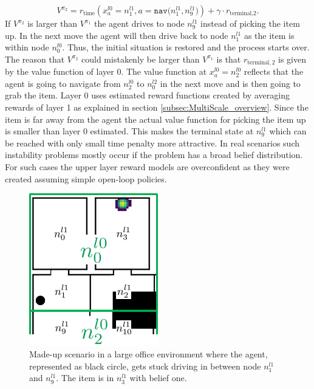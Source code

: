 %
\begin{equation}\label{eq:Vpi2}
V^{\pi_2}=r_\text{time}\left( x_a^{l0}=n_1^{l1}, a=\texttt{nav($n_1^{l1}, n_9^{l1}$)} \right) + \gamma \cdot r_{\text{terminal,}2}.
\end{equation}
If $V^{\pi_2}$ is larger than $V^{\pi_1}$ the agent drives to node $n_9^{l1}$ instead of picking the item up. In the next move the agent will then drive back to node $n_1^{l1}$ as the item is within node $n_0^{l0}$. Thus, the initial situation is restored and the process starts over. The reason that $V^{\pi_2}$ could mistakenly be larger than $V^{\pi_1}$ is that $r_{\text{terminal},2}$ is given by the value function of layer 0. The value function at $x_a^{l0}=n_2^{l0}$ reflects that the agent is going to navigate from $n_2^{l0}$ to $n_0^{l2}$ in the next move and is then going to grab the item. Layer 0 uses estimated reward functions created by averaging rewards of layer 1 as explained in section \ref{subsec:MultiScale_overview}. Since the item is far away from the agent the actual value function for picking the item up is smaller than layer 0 estimated. This makes the terminal state at $n_9^{l1}$ which can be reached with only small time penalty more attractive. In real scenarios such instability problems mostly occur if the problem has a broad belief distribution. For such cases the upper layer reward models are overconfident as they were created assuming simple open-loop policies.   

\begin{figure}
    \centering
    \includegraphics[width=0.5\textwidth]{Report/images/stability.png}
    \caption{Made-up scenario in a large office environment where the agent, represented as black circle, gets stuck driving in between node $n_1^{l1}$ and $n_9^{l1}$. The item is in $n_3^{l1}$ with belief one.}
    \label{fig:stability}
\end{figure}

